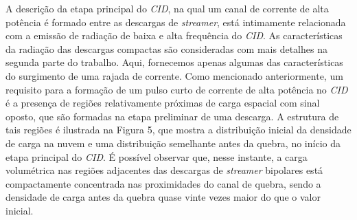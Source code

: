 \documentclass[a4paper, 12pt, onecolumn,singlespacing]{article}
\begin{document}
	A descrição da etapa principal do \textit{CID}, na qual um canal de corrente de alta potência é formado entre as descargas de \textit{streamer}, está intimamente relacionada com a emissão de radiação de baixa e alta frequência do \textit{CID}. As características da radiação das descargas compactas são consideradas com mais detalhes na segunda parte do trabalho. Aqui, fornecemos apenas algumas das características do surgimento de uma rajada de corrente. Como mencionado anteriormente, um requisito para a formação de um pulso curto de corrente de alta potência no \textit{CID} é a presença de regiões relativamente próximas de carga espacial com sinal oposto, que são formadas na etapa preliminar de uma descarga. A estrutura de tais regiões é ilustrada na Figura 5, que mostra a distribuição inicial da densidade de carga na nuvem e uma distribuição semelhante antes da quebra, no início da etapa principal do \textit{CID}. É possível observar que, nesse instante, a carga volumétrica nas regiões adjacentes das descargas de \textit{streamer} bipolares está compactamente concentrada nas proximidades do canal de quebra, sendo a densidade de carga antes da quebra quase vinte vezes maior do que o valor inicial.
	
\end{document}
